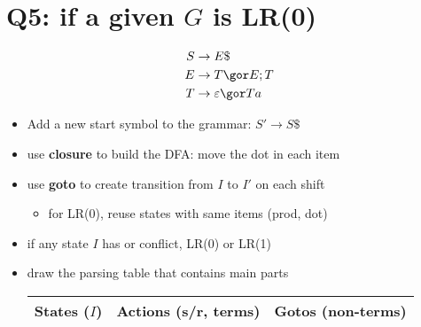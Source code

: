 \section*{Q5: if a given $G$ is LR(0)}
\begin{minipage}{.5\linewidth}
\begin{align*}
  S&\to E\$ \\
  E&\to T \gor E;T \\
  T&\to \varepsilon \gor Ta
\end{align*}
\end{minipage}
\begin{minipage}{.5\linewidth}
  \centering
\end{minipage}
\begin{itemize}
\item Add a new start symbol to the grammar: $S'\to S\$$
\item use \textbf{closure} to build the DFA: move the dot in each item
\end{itemize}
\begin{itemize}
\item use \textbf{goto} to create transition from $I$ to $I'$ on each shift
  \begin{itemize}[leftmargin=1em]
  \item for LR(0), reuse states with same items (prod, dot)
  \end{itemize}
\item if any state $I$ has  or  conflict,  LR(0) or LR(1)
\item draw the parsing table that contains  main parts
  \begin{minipage}{\linewidth}
    \centering
    \begin{tabular}{l|l|l}
      \hline
      States ($I$) & Actions (s/r, terms) & Gotos (non-terms)\\
      \hline
    \end{tabular}
  \end{minipage}
\end{itemize}
